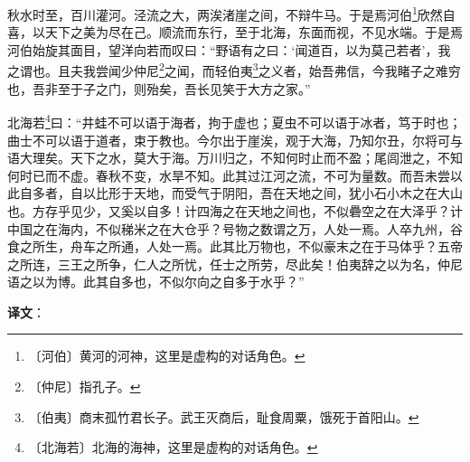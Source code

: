 \documentclass[12pt,UTF-8,openany,a4]{ctexbook}
\begin{document}
\begin{large}
    
    秋水时至，百川灌河。泾流之大，两涘渚崖之间，不辩牛马。于是焉河伯\footnote{〔河伯〕\yiwen 黄河的河神，这里是虚构的对话角色。}欣然自喜，以天下之美为尽在己。顺流而东行，至于北海，东面而视，不见水端。于是焉河伯始旋其面目，望洋向若而叹曰：“野语有之曰：‘闻道百，以为莫己若者’，我之谓也。且夫我尝闻少仲尼\footnote{〔仲尼〕\yiwen 指孔子。}之闻，而轻伯夷\footnote{〔伯夷〕\yiwen 商末孤竹君长子。武王灭商后，耻食周粟，饿死于首阳山。}之义者，始吾弗信，今我睹子之难穷也，吾非至于子之门，则殆矣，吾长见笑于大方之家。”
    
    北海若\footnote{〔北海若〕\yiwen 北海的海神，这里是虚构的对话角色。}曰：“井蛙不可以语于海者，拘于虚也；夏虫不可以语于冰者，笃于时也；曲士不可以语于道者，束于教也。今尔出于崖涘，观于大海，乃知尔丑，尔将可与语大理矣。天下之水，莫大于海。万川归之，不知何时止而不盈；尾闾泄之，不知何时已而不虚。春秋不变，水旱不知。此其过江河之流，不可为量数。而吾未尝以此自多者，自以比形于天地，而受气于阴阳，吾在天地之间，犹小石小木之在大山也。方存乎见少，又奚以自多！计四海之在天地之间也，不似礨空之在大泽乎？计中国之在海内，不似稊米之在大仓乎？号物之数谓之万，人处一焉。人卒九州，谷食之所生，舟车之所通，人处一焉。此其比万物也，不似豪末之在于马体乎？五帝之所连，三王之所争，仁人之所忧，任士之所劳，尽此矣！伯夷辞之以为名，仲尼语之以为博。此其自多也，不似尔向之自多于水乎？”

\end{large}


\newpage

\begin{Large}
   \noindent \textbf{译文}：
\end{Large}

\vspace{1em}
\end{document}
